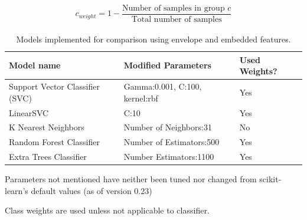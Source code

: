 \documentclass[\main/thesis.tex]{subfiles}
\begin{document}
\begin{subequations}
    \begin{align*}
    c_{weight} = 1-\dfrac{\text{Number of samples in group $c$} }{\text{Total number of samples}}
    \end{align*}
\end{subequations}

\begin{table}[t]
    \centering \hspace*{-0.8cm}
    \begin{threeparttable}
    \begin{tabular}[width=0.95\paperwidth]{|l|l|l|}
    \hline
    Model name & Modified Parameters\tnote{\dag}  & Used Weights? \tnote{\ddag} \\\hline
     Support Vector Classifier (SVC) &  Gamma:0.001, C:100, kernel:rbf & Yes\\
     LinearSVC & C:10 & Yes\\
     K Nearest Neighbors & Number of Neighbors:31 &  No \\
     Random Forest Classifier & Number of Estimators:500 & Yes \\
     Extra Trees Classifier & Number Estimators:1100 & Yes\\
     \hline
    \end{tabular}
    \caption{Models implemented for comparison using envelope and embedded features. }
    \begin{tablenotes}
    \item[\dag] Parameters not mentioned have neither been tuned nor changed from scikit-learn's default values (as of version 0.23)
    \item[\ddag] Class weights are used unless not applicable to classifier.
    \end{tablenotes}
    \label{table:mem_model_selection}
    \end{threeparttable}
\end{table}
\end{document}
